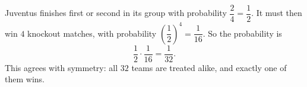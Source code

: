 Juventus finishes first or second in its group with probability $\dfrac{2}{4}=\dfrac{1}{2}$. It must then win $4$ knockout matches, with probability $\left(\dfrac{1}{2}\right)^4=\dfrac{1}{16}$. So the probability is
\[\dfrac{1}{2}\cdot\dfrac{1}{16}=\boxed{\dfrac{1}{32}}.\]
This agrees with symmetry: all $32$ teams are treated alike, and exactly one of them wins.
